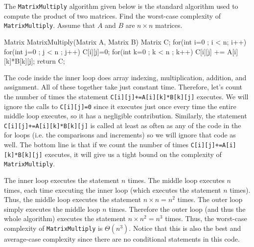 \begin{exa}\label{exa:matmult}
The \verb+MatrixMultiply+ algorithm given below is the standard algorithm used to 
compute the product of two matrices.
Find the worst-case complexity of \verb+MatrixMultiply+.
Assume that $A$ and $B$ are $n\times n$ matrices.
\begin{code}
  Matrix MatrixMultiply(Matrix A, Matrix B) {
      Matrix C;
      for(int i=0 ; i < n; i++) {
          for(int j=0 ; j < n ; j++) {
              C[i][j]=0;
              for(int k=0 ; k < n ; k++) {
                  C[i][j] += A[i][k]*B[k][j];
              }
          }
      }
      return C;
  }
\end{code}
\begin{sol}
The code inside the inner loop does array indexing, multiplication, addition,
and assignment.  All of these together take just constant time.  
Therefore, let's count the number of times the statement \verb#C[i][j]+=A[i][k]*B[k][j]#
executes.  We will ignore the calls to \verb+C[i][j]=0+ since it executes just once
every time the entire middle loop executes, so it has a negligible contribution.
Similarly, the statement \verb#C[i][j]+=A[i][k]*B[k][j]# is called at least as often
as any of the code in the for loops (i.e. the comparisons and increments) so we will
ignore that code as well.  The bottom line is that if we count the number of times 
\verb#C[i][j]+=A[i][k]*B[k][j]# executes, it will give us a tight bound on the complexity
of \verb+MatrixMultiply+.

The inner loop executes the statement $n$ times.  
The middle loop executes $n$ times, each time executing the inner loop (which executes
the statement $n$ times).
Thus, the middle loop executes the statement $n\times n=n^2$ times.
The outer loop simply executes the middle loop $n$ times.  Therefore the outer loop
(and thus the whole algorithm) executes the statement $n\times n^2=n^3$ times.
Thus, the worst-case complexity of \verb+MatrixMultiply+ is $\Theta(n^3)$.
Notice that this is also the best and average-case complexity since there are no
conditional statements in this code.
\end{sol}
\end{exa}

